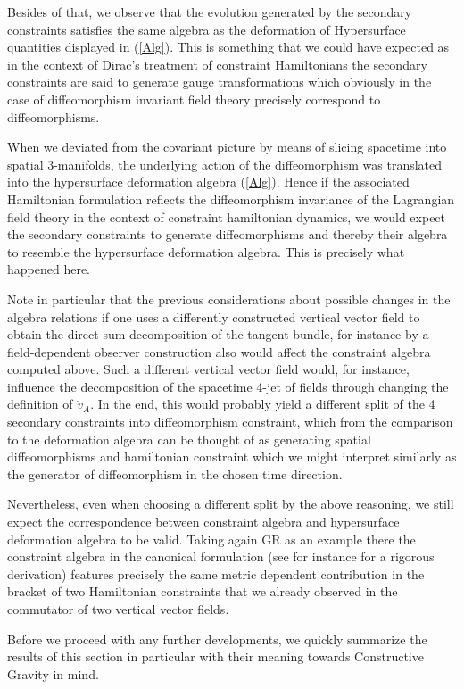 \documentclass[a4paper,12pt, DIV=14, BCOR=5mm, twoside, headsepline, numbers=noenddot]{scrbook}
\begin{document}
Besides of that, we observe that the evolution generated by the secondary constraints satisfies the same algebra as the deformation of Hypersurface quantities displayed in (\ref{Alg}). This is something that we could have expected as in the context of Dirac's treatment of constraint Hamiltonians the secondary constraints are said to generate gauge transformations which obviously in the case of diffeomorphism invariant field theory precisely correspond to diffeomorphisms. 

When we deviated from the covariant picture by means of slicing spacetime into spatial 3-manifolds, the underlying action of the diffeomorphism was translated into the hypersurface deformation algebra (\ref{Alg}).
Hence if the associated Hamiltonian formulation reflects the diffeomorphism invariance of the Lagrangian field theory in the context of constraint hamiltonian dynamics, we would expect the secondary constraints to generate diffeomorphisms and thereby their algebra to resemble the hypersurface deformation algebra. This is precisely what happened here.

Note in particular that the previous considerations about possible changes in the algebra relations if one uses a differently constructed vertical vector field to obtain the direct sum decomposition of the tangent bundle, for instance by a field-dependent observer construction also would affect the constraint algebra computed above. Such a different vertical vector field would, for instance, influence the decomposition of the spacetime 4-jet of fields through changing the definition of $\dot{v}_A$. In the end, this would probably yield a different split of the 4 secondary constraints into diffeomorphism constraint, which from the comparison to the deformation algebra can be thought of as generating spatial diffeomorphisms and hamiltonian constraint which we might interpret similarly as the generator of diffeomorphism in the chosen time direction. 

Nevertheless, even when choosing a different split by the above reasoning, we still expect the correspondence between constraint algebra and hypersurface deformation algebra to be valid. Taking again GR as an example there the constraint algebra in the canonical formulation (see for instance \cite{thiemann_2007} for a rigorous derivation) features precisely the same metric dependent contribution in the bracket of two Hamiltonian constraints that we already observed in the commutator of two vertical vector fields. 

Before we proceed with any further developments, we quickly summarize the results of this section in particular with their meaning towards Constructive Gravity in mind. 
\end{document}
